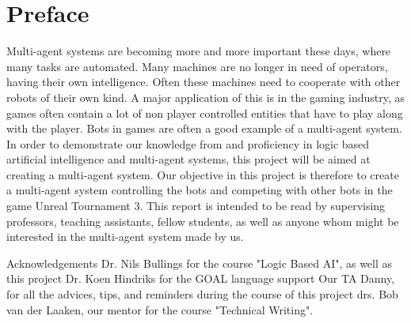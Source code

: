 \chapter*{Preface}
Multi-agent systems are becoming more and more important these days, where many tasks are automated. Many machines are no longer in need of operators, having their own intelligence. Often these machines need to cooperate with other robots of their own kind. A major application of this is in the gaming industry, as games often contain a lot of non player controlled entities that have to play along with the player. Bots in games are often a good example of a multi-agent system.
    In order to demonstrate our knowledge from and proficiency in logic based artificial intelligence and multi-agent systems, this project will be aimed at creating a multi-agent system. Our objective in this project is therefore to create a multi-agent system controlling the bots and competing with other bots in the game Unreal Tournament 3. 
    This report is intended to be read by supervising professors, teaching assistants, fellow students, as well as anyone whom might be interested in the multi-agent system made by us.

Acknowledgements
    Dr. Nils Bullings for the course "Logic Based AI", as well as this project
    Dr. Koen Hindriks for the GOAL language support
    Our TA Danny, for all the advices, tips, and reminders during the course of this project
    drs. Bob van der Laaken, our mentor for the course "Technical Writing". 